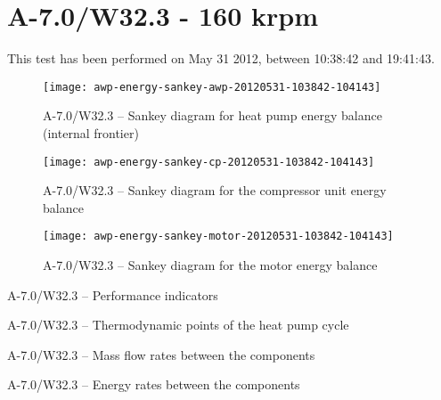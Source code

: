 
\section{A-7.0/W32.3 - 160 krpm}
\label{sec:awp-exp-details-A-7.0/W32.3}

This test has been performed on May 31\th{} 2012, between 10:38:42 and
19:41:43.

\begin{figure}[htbp]
  \centering
  \texttt{[image: awp-energy-sankey-awp-20120531-103842-104143]}
  \caption{A-7.0/W32.3 -- Sankey diagram for heat pump energy balance (internal frontier)}
  \label{fig:awp-A-7.0/W32.3-sankey-energy}
\end{figure}


\begin{figure}[htbp]
  \centering
  \texttt{[image: awp-energy-sankey-cp-20120531-103842-104143]}
  \caption{A-7.0/W32.3 -- Sankey diagram for the compressor unit energy balance}
  \label{fig:awp-A-7.0/W32.3-sankey-cp}
\end{figure}

\begin{figure}[htbp]
  \centering
  \texttt{[image: awp-energy-sankey-motor-20120531-103842-104143]}
  \caption{A-7.0/W32.3 -- Sankey diagram for the motor energy balance}
  \label{fig:awp-A-7.0/W32.3-sankey-motor}
\end{figure}

\begin{table}[htbp]
    \footnotesize
    \begin{center}
    
  \end{center}
  \caption{A-7.0/W32.3 -- Performance indicators}
\end{table}

\begin{table}[htbp]
  \footnotesize
  \begin{center}
    
  \end{center}
  \caption{A-7.0/W32.3 -- Thermodynamic points of the heat pump cycle}
\end{table}


\begin{table}[htbp]
    \footnotesize
    \begin{center}
    
  \end{center}
  \caption{A-7.0/W32.3 -- Mass flow rates between the components}
\end{table}

\begin{table}[htbp]
    \footnotesize
    \begin{center}
    
  \end{center}
  \caption{A-7.0/W32.3 -- Energy rates between the components}
\end{table}

\FloatBarrier
